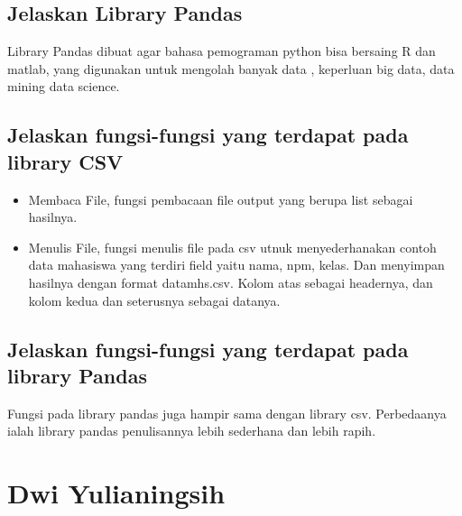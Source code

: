 \subsection {Jelaskan Library Pandas}
Library Pandas dibuat agar bahasa pemograman python bisa bersaing R dan matlab, yang digunakan untuk mengolah banyak data , keperluan big data, data mining data science.

\subsection {Jelaskan fungsi-fungsi yang terdapat pada library CSV}
\begin{itemize}
    \item Membaca File, fungsi pembacaan file output yang berupa list sebagai hasilnya.
    \item Menulis File, fungsi menulis file pada csv utnuk menyederhanakan contoh data mahasiswa yang terdiri field yaitu nama, npm, kelas. Dan menyimpan hasilnya dengan format datamhs.csv. Kolom atas sebagai headernya, dan kolom kedua dan seterusnya sebagai datanya.
\end{itemize}

\subsection {Jelaskan fungsi-fungsi yang terdapat pada library Pandas}
Fungsi pada library pandas juga hampir sama dengan library csv. Perbedaanya ialah library pandas penulisannya lebih sederhana dan lebih rapih.


\section{Dwi Yulianingsih}
